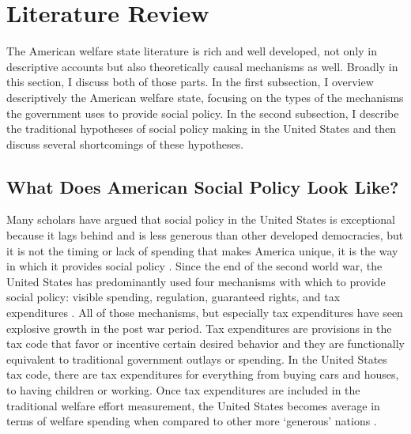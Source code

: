 \documentclass[12pt]{article}
\begin{document}

\section{Literature Review}

The American welfare state literature is rich and well developed, not only in descriptive accounts but also theoretically causal mechanisms as well. Broadly in this section, I discuss both of those parts. In the first subsection, I overview descriptively the American welfare state, focusing on the types of the mechanisms the government uses to provide social policy. In the second subsection, I describe the traditional hypotheses of social policy making in the United States and then discuss several shortcomings of these hypotheses. 

\subsection{What Does American Social Policy Look Like?}
Many scholars have argued that social policy in the United States is exceptional because it lags behind and is less generous than other developed democracies, but it is not the timing or lack of spending that makes America unique, it is the way in which it provides social policy \citep{hacker2002}. Since the end of the second world war, the United States has predominantly used four mechanisms with which to provide social policy: visible spending, regulation, guaranteed rights, and tax expenditures \citep{pierson2007}. All of those mechanisms, but especially tax expenditures have seen explosive growth in the post war period. Tax expenditures are provisions in the tax code that favor or incentive  certain desired behavior and they are functionally equivalent to traditional government outlays or spending. In the United States tax code, there are tax expenditures for everything from buying cars and houses, to having children or working. Once tax expenditures are included in the traditional welfare effort measurement, the United States becomes average in terms of welfare spending when compared to other more `generous' nations \citep[Ch. 1]{howard2008}.
\end{document}
